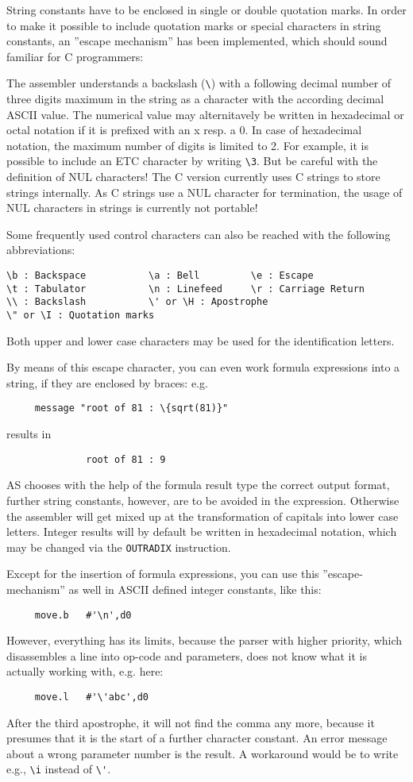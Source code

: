 \documentclass[12pt,twoside]{report}
\newcommand{\tty}[1]{{\tt #1}}
\begin{document}
String constants have to be enclosed in single or double quotation marks.
In order to make it possible to include quotation marks or special characters
in string constants, an ''escape mechanism'' has been implemented, which
should sound familiar for C programmers:

The assembler understands a backslash (\verb!\!) with a following decimal
number of three digits maximum in the string as a character with the
according decimal ASCII value.  The numerical value may alternitavely be
written in hexadecimal or octal notation if it is prefixed with an x resp.
a 0.  In case of hexadecimal notation, the maximum number of digits is
limited to 2.  For example, it is possible to include an ETC character by
writing {\tt\verb!\!3}.  But be careful with the definition of NUL
characters!  The C  version currently uses C strings
to store strings internally.  As C strings use a NUL character for
termination, the usage of NUL characters in strings is currently not
portable!

Some frequently used control characters can also be reached with the
following abbreviations:
\begin{verbatim}
\b : Backspace           \a : Bell         \e : Escape
\t : Tabulator           \n : Linefeed     \r : Carriage Return
\\ : Backslash           \' or \H : Apostrophe
\" or \I : Quotation marks
\end{verbatim}
Both upper and lower case characters may be used for the
identification letters.

By means of this escape character, you can even work formula
expressions into a string, if they are enclosed by braces: e.g.
\begin{verbatim}
     message "root of 81 : \{sqrt(81)}"
\end{verbatim}
results in
\begin{verbatim}
              root of 81 : 9
\end{verbatim}
AS chooses with the help of the formula result type the correct
output format, further string constants, however, are to be avoided
in the expression.  Otherwise the assembler will get mixed up at the
transformation of capitals into lower case letters.  Integer results will
by default be written in hexadecimal notation, which may be changed via
the \tty{OUTRADIX} instruction.

Except for the insertion of formula expressions, you can use this
''escape-mechanism'' as well in ASCII defined integer constants,
like this:
\begin{verbatim}
     move.b   #'\n',d0
\end{verbatim}
However, everything has its limits, because the parser with higher
priority, which disassembles a line into op-code and parameters, does
not know what it is actually working with, e.g. here:
\begin{verbatim}
     move.l   #'\'abc',d0
\end{verbatim}
After the third apostrophe, it will not find the comma any more,
because it presumes that it is the start of a further character
constant. An error message about a wrong parameter number is the result.
A workaround would be to write e.g., \verb!\i! instead of \verb!\'!.
\end{document}
